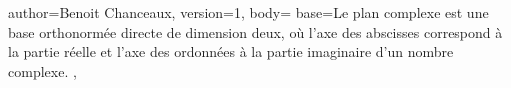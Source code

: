 {
author={Benoit Chanceaux},
version={1},
body={
base={Le plan complexe est une base orthonormée directe de dimension deux, où l'axe des abscisses correspond à la
partie réelle et l'axe des ordonnées à la partie imaginaire d'un nombre complexe.
}
},
}